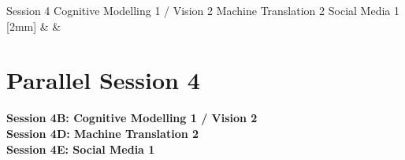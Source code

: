 \clearpage
{}
\begin{ThreeSessionOverview}{Session 4}{\daydateyear}
  {Cognitive Modelling 1 / Vision 2}
  {Machine Translation 2}
  {Social Media 1}
  [2mm]
   &  & 
  \\
\end{ThreeSessionOverview}

\newpage
\section*{Parallel Session 4}
{\bfseries\large Session 4B: Cognitive Modelling 1 / Vision 2}\\
\TrackALoc\hfill\sessionchair{}{}
\clearpage
{\bfseries\large Session 4D: Machine Translation 2}\\
\TrackBLoc\hfill\sessionchair{}{}
\clearpage
{\bfseries\large Session 4E: Social Media 1}\\
\TrackCLoc\hfill\sessionchair{}{}
\clearpage


